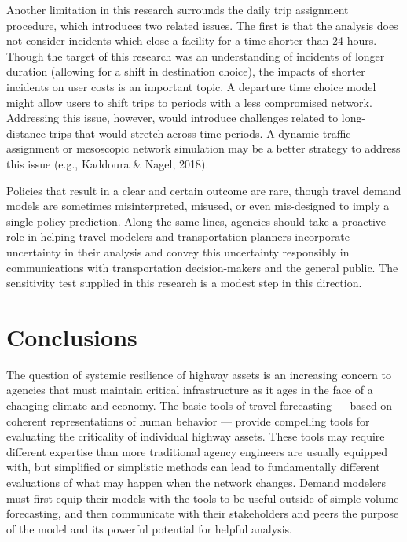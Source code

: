 \documentclass[
  letterpaper,
  number,
  review,
  3p]{elsarticle}
\begin{document}
Another limitation in this research surrounds the daily trip assignment
procedure, which introduces two related issues. The first is that the
analysis does not consider incidents which close a facility for a time
shorter than 24 hours. Though the target of this research was an
understanding of incidents of longer duration (allowing for a shift in
destination choice), the impacts of shorter incidents on user costs is
an important topic. A departure time choice model might allow users to
shift trips to periods with a less compromised network. Addressing this
issue, however, would introduce challenges related to long-distance
trips that would stretch across time periods. A dynamic traffic
assignment or mesoscopic network simulation may be a better strategy to
address this issue (e.g., Kaddoura \& Nagel, 2018).

Policies that result in a clear and certain outcome are rare, though
travel demand models are sometimes misinterpreted, misused, or even
mis-designed to imply a single policy prediction. Along the same lines,
agencies should take a proactive role in helping travel modelers and
transportation planners incorporate uncertainty in their analysis and
convey this uncertainty responsibly in communications with
transportation decision-makers and the general public. The sensitivity
test supplied in this research is a modest step in this direction.


\hypertarget{conclusions}{%
\section{Conclusions}\label{conclusions}}

The question of systemic resilience of highway assets is an increasing
concern to agencies that must maintain critical infrastructure as it
ages in the face of a changing climate and economy. The basic tools of
travel forecasting --- based on coherent representations of human
behavior --- provide compelling tools for evaluating the criticality of
individual highway assets. These tools may require different expertise
than more traditional agency engineers are usually equipped with, but
simplified or simplistic methods can lead to fundamentally different
evaluations of what may happen when the network changes. Demand modelers
must first equip their models with the tools to be useful outside of
simple volume forecasting, and then communicate with their stakeholders
and peers the purpose of the model and its powerful potential for
helpful analysis.
\end{document}

